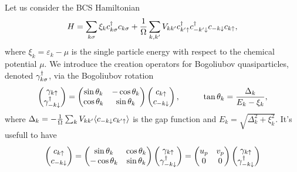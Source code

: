 Let us consider the BCS Hamiltonian
\begin{equation*}
	H = \sum_{k \sigma} \xi_k c_{k \sigma} ^{\dag} c_{k \sigma} +  \frac{1}{\Omega} \sum_{k, k'} V_{k k'} c^{\dag}_{k' \uparrow} c^{\dag}_{-k' \downarrow} c_{-k \downarrow} c_{k \uparrow},
\end{equation*}
where $\xi_k = \varepsilon_k - \mu$ is the single particle energy with respect to the chemical potential $\mu$. We introduce the creation operators for Bogoliubov quasiparticles, denoted $\gamma_{k \sigma}^{\dag}$, via the Bogoliubov rotation
\begin{equation*}
	\begin{pmatrix}
		\gamma_{k \up} \\ \gamma_{-k\down}\D
	\end{pmatrix}
	=
	\begin{pmatrix}
	    \sin \theta_k & -\cos \theta_k \\
	    \cos \theta_k & \sin \theta_k \\
	\end{pmatrix}
	\begin{pmatrix}
		c_{k \up} \\ c_{-k \down}
	\end{pmatrix},
	\hspace{10 mm} 
	\tan \theta_k = \frac{\Delta_k}{E_k - \xi_k},
\end{equation*}
where $\Delta_k = - \frac{1}{\Omega} \sum_k V_{kk'} \langle c_{-k \downarrow} c_{k' \uparrow}\rangle$ is the gap function and $E_k = \sqrt{\Delta_k^2 + \xi_k^2}$. It's usefull to have
\begin{equation*}
	\begin{pmatrix}
		c_{k \uparrow} \\ c_{-k \downarrow}
	\end{pmatrix} = \begin{pmatrix}
	    \sin \theta_k & \cos \theta_k \\
	    -\cos \theta_k & \sin \theta_k \\
	\end{pmatrix}
	\begin{pmatrix}
		\gamma_{k \uparrow} \\ \gamma_{-k \downarrow}^{\dag}
	\end{pmatrix} = 
	\begin{pmatrix}
	    u_p & v_p \\
	    0 & 0 \\
	\end{pmatrix}
	\begin{pmatrix}
		\gamma_{k \uparrow} \\ \gamma_{-k \downarrow}^{\dag}
	\end{pmatrix}
\end{equation*}

